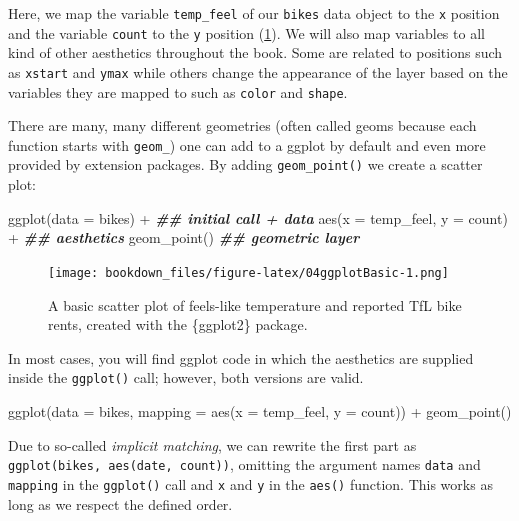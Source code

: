 \documentclass[
]{krantz}
\makeatletter
\newenvironment{Shaded}{\begin{snugshade}}{\end{snugshade}}
\newcommand{\AttributeTok}[1]{\textcolor[rgb]{0.61,0.61,0.61}{#1}}
\newcommand{\DocumentationTok}[1]{\textcolor[rgb]{0.37,0.37,0.37}{\textbf{\textit{#1}}}}
\newcommand{\FunctionTok}[1]{\textcolor[rgb]{0,0,0}{#1}}
\newcommand{\NormalTok}[1]{#1}
\newcommand{\SpecialCharTok}[1]{\textcolor[rgb]{0,0,0}{#1}}
\newenvironment{kframe}{%
\medskip{}
\setlength{\fboxsep}{.8em}
 \def\at@end@of@kframe{}%
 \ifinner\ifhmode%
  \def\at@end@of@kframe{\end{minipage}}%
  \begin{minipage}{\columnwidth}%
 \fi\fi%
 \def\FrameCommand##1{\hskip\@totalleftmargin \hskip-\fboxsep
 \colorbox{shadecolor}{##1}\hskip-\fboxsep
     \hskip-\linewidth \hskip-\@totalleftmargin \hskip\columnwidth}%
 \MakeFramed {\advance\hsize-\width
   \@totalleftmargin\z@ \linewidth\hsize
   \@setminipage}}%
 {\par\unskip\endMakeFramed%
 \at@end@of@kframe}
\renewenvironment{Shaded}{\begin{kframe}}{\end{kframe}}
\makeatother
\begin{document}
Here, we map the variable \texttt{temp\_feel} of our \texttt{bikes} data object to the \texttt{x} position and the variable \texttt{count} to the \texttt{y} position (\ref{fig:04ggplotBasic}). We will also map variables to all kind of other aesthetics throughout the book. Some are related to positions such as \texttt{xstart} and \texttt{ymax} while others change the appearance of the layer based on the variables they are mapped to such as \texttt{color} and \texttt{shape}.

There are many, many different geometries (often called geoms because each function starts with \texttt{geom\_}) one can add to a ggplot by default and even more provided by extension packages. By adding \texttt{geom\_point()} we create a scatter plot:

\begin{Shaded}
\begin{Highlighting}[]
\FunctionTok{ggplot}\NormalTok{(}\AttributeTok{data =}\NormalTok{ bikes) }\SpecialCharTok{+} \DocumentationTok{\#\# initial call + data}
  \FunctionTok{aes}\NormalTok{(}\AttributeTok{x =}\NormalTok{ temp\_feel, }\AttributeTok{y =}\NormalTok{ count) }\SpecialCharTok{+} \DocumentationTok{\#\# aesthetics}
  \FunctionTok{geom\_point}\NormalTok{() }\DocumentationTok{\#\# geometric layer}
\end{Highlighting}
\end{Shaded}

\begin{figure}
\centering
\texttt{[image: bookdown\_files/figure-latex/04ggplotBasic-1.png]}
\caption{\label{fig:04ggplotBasic}A basic scatter plot of feels-like temperature and reported TfL bike rents, created with the \{ggplot2\} package.}
\end{figure}

In most cases, you will find ggplot code in which the aesthetics are supplied inside the \texttt{ggplot()} call; however, both versions are valid.

\begin{Shaded}
\begin{Highlighting}[]
\FunctionTok{ggplot}\NormalTok{(}\AttributeTok{data =}\NormalTok{ bikes, }\AttributeTok{mapping =} \FunctionTok{aes}\NormalTok{(}\AttributeTok{x =}\NormalTok{ temp\_feel, }\AttributeTok{y =}\NormalTok{ count)) }\SpecialCharTok{+}
  \FunctionTok{geom\_point}\NormalTok{()}
\end{Highlighting}
\end{Shaded}

Due to so-called \emph{implicit matching}, we can rewrite the first part as \texttt{ggplot(bikes,\ aes(date,\ count))}, omitting the argument names \texttt{data} and \texttt{mapping} in the \texttt{ggplot()} call and \texttt{x} and \texttt{y} in the \texttt{aes()} function. This works as long as we respect the defined order.
\end{document}
